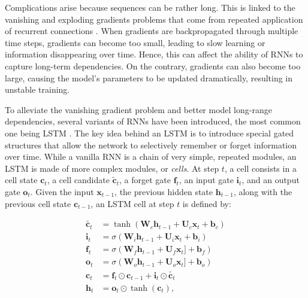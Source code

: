 Complications arise because sequences can be rather long. This is linked to the vanishing and exploding gradients problems that come from repeated application of recurrent connections \citep{hochreiter2001gradient}. When gradients are backpropagated through multiple time steps, gradients can become too small, leading to slow learning or information disappearing over time. Hence, this can affect the ability of \acp{RNN} to capture long-term dependencies. On the contrary, gradients can also become too large, causing the model's parameters to be updated dramatically, resulting in unstable training. 

To alleviate the vanishing gradient problem and better model long-range dependencies, several variants of \acp{RNN} have been introduced, the most common one being \ac{LSTM} \citep{hochreiter1997long}. The key idea behind an \ac{LSTM} is to introduce special gated structures that allow the network to selectively remember or forget information over time. While a vanilla \ac{RNN} is a chain of very simple, repeated modules, an \ac{LSTM} is made of more complex modules, or \textit{cells}. At step $t$, a cell consists in a cell state $\bm{c}_t$, a cell candidate $\tilde{\bm{c}}_t$, a forget gate $\bm{f}_t$, an input gate $\bm{i}_t$, and an output gate $\bm{o}_t$. Given the input $\bm{x}_{t-1}$, the previous hidden state $\bm{h}_{t-1}$, along with the previous cell state $\bm{c}_{t-1}$, an \ac{LSTM} cell at step $t$ is defined by:

\begin{equation}
\begin{aligned}
    \tilde{\bm{c}_t} &= \tanh \left( \bm{W}_c \bm{h}_{t-1} + \bm{U}_c \bm{x}_t + \bm{b}_c \right)\\
    \bm{i}_t         &= \sigma \left( \bm{W}_i \bm{h}_{t-1} + \bm{U}_i \bm{x}_t + \bm{b}_i \right) \\
    \bm{f}_t         &= \sigma \left( \bm{W}_f \bm{h}_{t-1} + \bm{U}_f \bm{x}_t] + \bm{b}_f \right) \\
    \bm{o}_t         &= \sigma \left( \bm{W}_o \bm{h}_{t-1} + \bm{U}_o \bm{x}_t] + \bm{b}_o \right) \\
    \bm{c}_t         &= \bm{f}_t \odot \bm{c}_{t-1} + \bm{i}_t \odot \tilde{\bm{c}_t} \\
    \bm{h}_t         &= \bm{o}_t \odot \tanh (\bm{c}_t),
\end{aligned}
\end{equation}

